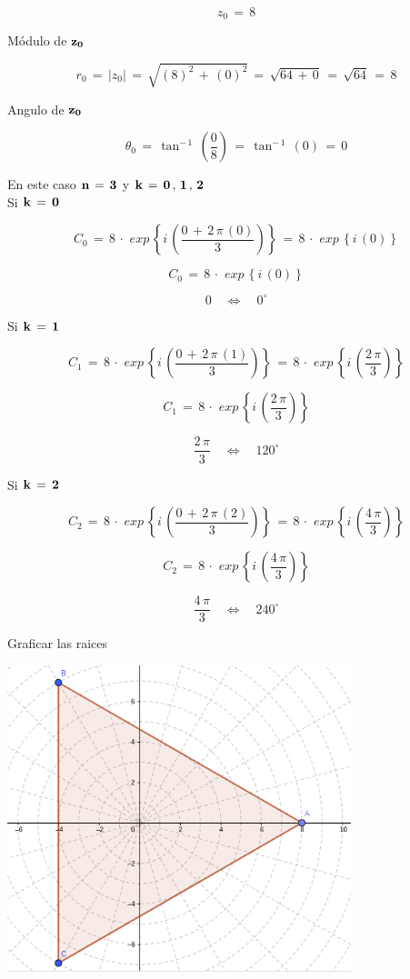 \documentclass[a4paper,11pt,openany]{book}
\begin{document}
$$z_{0}\,=\,8$$

\textcolor{ao(english)}{} Módulo de $\bf{z_{0}}$

$$r_{0}\,=\,|z_{0}|\,=\,\sqrt{\left(8\right)^{2}\,+\,\left(0\right)^{2}}\,=\,\sqrt{64\,+\,0}\,=\,\sqrt{64}\,=\,8$$

\textcolor{ao(english)}{} Angulo de $\bf{z_{0}}$

$$\theta_{0}\,=\,\tan^{-\,1}\,\left(\dfrac{0}{8}\right)\,=\,\tan^{-\,1}\,\left(0\right)\,=\,0$$

\textcolor{ao(english)}{} En este caso $\bf{n\,=\,3}$ y $\bf{k\,=\,0\,,\,1\,,\,2}$\\

\textcolor{ao(english)}{} Si $\bf{k\,=\,0}$

$$C_{0}\,=\,8\,\cdot\,\,exp\,\left\{i\,\left(\dfrac{0\,+\,2\,\pi\,(0)}{3}\right)\right\}\,=\,8\,\cdot\,\,exp\,\left\{i\,\left(0\right)\right\}$$

$$C_{0}\,=\,8\,\cdot\,\,exp\,\left\{i\,\left(0\right)\right\}$$

$$0 \quad\iff\quad 0^\circ$$

\textcolor{ao(english)}{} Si $\bf{k\,=\,1}$

$$C_{1}\,=\,8\,\cdot\,\,exp\,\left\{i\,\left(\dfrac{0\,+\,2\,\pi\,(1)}{3}\right)\right\}\,=\,8\,\cdot\,\,exp\,\left\{i\,\left(\frac{2\,\pi}{3}\right)\right\}$$

$$C_{1}\,=\,8\,\cdot\,\,exp\,\left\{i\,\left(\frac{2\,\pi}{3}\right)\right\}$$

$$\frac{2\,\pi}{3} \quad\iff\quad 120^\circ$$

\textcolor{ao(english)}{} Si $\bf{k\,=\,2}$

$$C_{2}\,=\,8\,\cdot\,\,exp\,\left\{i\,\left(\dfrac{0\,+\,2\,\pi\,(2)}{3}\right)\right\}\,=\,8\,\cdot\,\,exp\,\left\{i\,\left(\frac{4\,\pi}{3}\right)\right\}$$

$$C_{2}\,=\,8\,\cdot\,\,exp\,\left\{i\,\left(\frac{4\,\pi}{3}\right)\right\}$$

$$\frac{4\,\pi}{3} \quad\iff\quad 240^\circ$$

\textcolor{ao(english)}{} Graficar las raices

\begin{center}
    \includegraphics[width=10cm]{Gra-Ej-9.png}
\end{center}
\end{document}
